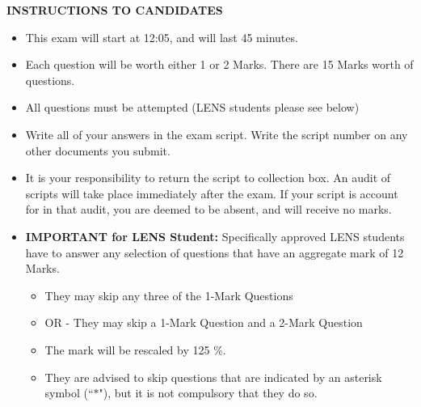 \documentclass[a4paper,12pt]{article}
\begin{document}
\begin{center}
	{\bf INSTRUCTIONS TO CANDIDATES}
\end{center}
\begin{itemize} 
	\item This exam will start at 12:05, and will last 45 minutes.
	
	\item Each question will be worth either 1 or 2 Marks. There are 15 Marks worth of questions.
	\item All questions must be attempted (LENS students please see below)
	
	\item Write all of your answers in the exam script. Write the script number on any other documents you submit.
	
	\item It is your responsibility to return the script to collection box. An audit of scripts will take place immediately after the exam. If your script is account for in that audit,  you are deemed to be absent, and will receive no marks.
	
	\item \textbf{IMPORTANT for LENS Student:}
	Specifically approved LENS students have to answer any selection of questions that have an aggregate mark of 12 Marks.  
	\begin{itemize}
		\item They may skip any three of the 1-Mark Questions
		\item OR - They may skip a 1-Mark Question and a 2-Mark Question
		\item The mark will be rescaled by 125 \%.
		\item They are advised to skip questions that are indicated by an asterisk symbol (``$\ast$"), but it is not compulsory that they do so.
	\end{itemize}
	
	
\end{itemize}
\newpage
\end{document}
